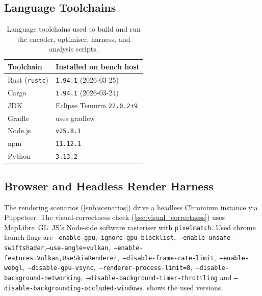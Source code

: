 \subsection{Language Toolchains}\label{app:bench_toolchains}

\begin{table}[htbp]
\centering
\begin{tabular}{@{}l l@{}}
\toprule
\textbf{Toolchain} & \textbf{Installed on bench host} \\
\midrule
Rust (\texttt{rustc})  & \texttt{1.94.1} (2026-03-25) \\
Cargo                  & \texttt{1.94.1} (2026-03-24) \\
JDK                    & Eclipse Temurin \texttt{22.0.2+9} \\
Gradle                 & uses gradlew \\
Node.js                & \texttt{v25.8.1} \\
npm                    & \texttt{11.12.1} \\
Python                 & \texttt{3.13.2} \\
\bottomrule
\end{tabular}
\caption{
Language toolchains used to build and run the encoder, optimiser, harness, and analysis scripts.}
\label{tab:bench_toolchains}
\end{table}



\subsection{Browser and Headless Render Harness}\label{app:bench_browser}

The rendering scenarios (\cref{sub:scenarios}) drive a headless Chromium instance via Puppeteer.
The visual-correctness check (\cref{sec:visual_correctness}) uses MapLibre~GL~JS's Node-side software rasteriser with \texttt{pixelmatch}.
Used chrome launch flags are \texttt{--enable-gpu},\allowbreak\texttt{--ignore-gpu-blocklist},\allowbreak\
\texttt{--enable-unsafe-swiftshader},\allowbreak\texttt{--use-angle=vulkan},\allowbreak\
\texttt{--enable-features=Vulkan,UseSkiaRenderer},\allowbreak\
\texttt{--disable-frame-rate-limit},\allowbreak\
\texttt{--enable-webgl},\allowbreak\
\texttt{--disable-gpu-vsync},\allowbreak\
\texttt{--renderer-process-limit=8},\allowbreak\
\texttt{--disable-background-networking},\allowbreak\
\texttt{--disable-background-timer-throttling} and
\texttt{--disable-backgrounding-occluded-windows}.
\Cref{tab:bench_browser} shows the used versions.

